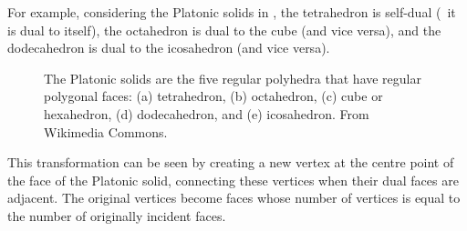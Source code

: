 For example, considering the Platonic solids in , the tetrahedron is self-dual (\ie\ it is dual to itself), the octahedron is dual to the cube (and vice versa), and the dodecahedron is dual to the icosahedron (and vice versa).
\begin{figure}[tbp]
\centering
{}
\quad
{}
\quad
{}
\quad
{}
\quad
{}
\caption[The Platonic solids]{The Platonic solids are the five regular polyhedra that have regular polygonal faces: (a) tetrahedron, (b) octahedron, (c) cube or hexahedron, (d) dodecahedron, and (e) icosahedron. From Wikimedia Commons.}
\label{fig:ps}
\end{figure}
This transformation can be seen by creating a new vertex at the centre point of the face of the Platonic solid, connecting these vertices when their dual faces are adjacent.
The original vertices become faces whose number of vertices is equal to the number of originally incident faces.